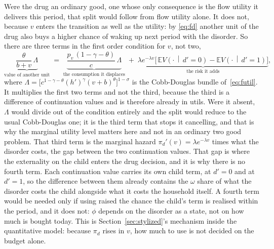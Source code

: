 \documentclass[10pt]{article}
\begin{document}
Were the drug an ordinary good, one whose only consequence is the flow
utility it delivers this period, that split would follow from flow utility
alone.
It does not, because $v$ enters the transition as well as the utility: by
\eqref{eq:fd} another unit of the drug also buys a higher chance of waking up
next period with the disorder. So there are three terms in the first order
condition for $v$, not
two,
\begin{equation}\label{eq:fcv}
\underbrace{\frac{\theta}{b+v}\,\Lambda}_{\text{value of another unit}}
\;=\;
\underbrace{\frac{p_v\,(1-\gamma-\theta)}{c}\,\Lambda}_{\text{the consumption it displaces}}
\;+\;
\underbrace{\lambda e^{-\lambda v}\Big[\,\mathbb E V\!\left(\cdot\,\middle|\,d'=0\right)-
\mathbb E V\!\left(\cdot\,\middle|\,d'=1\right)\Big]}_{\text{the risk it adds}} ,
\end{equation}
where $\Lambda=\big[c^{1-\gamma-\theta}(h')^{\gamma}(v+b)^{\theta}\big]^{1-\sigma}$
is the Cobb-Douglas bundle of~\eqref{eq:futil}. It multiplies the first two
terms and not the third, because the third is a difference of continuation
values and is therefore already in utils. Were it absent, $\Lambda$ would divide
out of the condition entirely and the split would reduce to the usual
Cobb-Douglas one; it is the third term that stops it cancelling, and that is why
the marginal utility level matters here and not in an ordinary two good
problem. That third term is the marginal hazard $\pi_d'(v)=\lambda e^{-\lambda
v}$ times what the disorder costs, the gap between the two continuation values.
That gap is where the externality on the child enters the drug decision,
and it is why there is no fourth term. Each continuation value carries its own child
term, at $d'=0$ and at $d'=1$, so the difference between them already contains the
$\omega$ share of what the disorder costs the child alongside what it costs the
household itself. A fourth term would be needed only if using raised the chance the
child's term is realised within the period, and it does not: $\phi$ depends on the
disorder as a state, not on how much is bought today.
This is Section~\ref{sec:stylized}'s mechanism inside the quantitative model:
because $\pi_d$ rises in $v$, how much to use is not decided on the budget alone.
\end{document}
